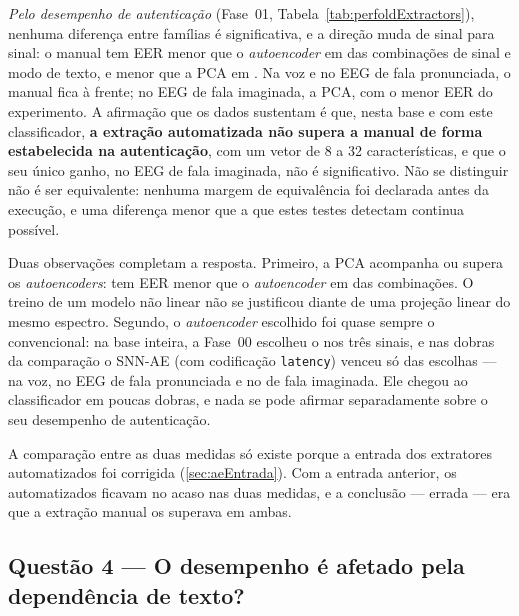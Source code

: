 	\par \emph{Pelo desempenho de autenticação} (Fase~01,
	Tabela~\ref{tab:perfoldExtractors}), nenhuma diferença entre famílias é
	significativa, e a direção muda de sinal para sinal: o manual tem \ac{EER}
	menor que o \textit{autoencoder} em  das
	 combinações de sinal e modo de texto, e menor que a
	\ac{PCA} em . Na voz e no \ac{EEG} de fala
	pronunciada, o manual fica à frente; no \ac{EEG} de fala imaginada, a
	\ac{PCA}, com o menor \ac{EER} do experimento. A afirmação que os dados
	sustentam é que, nesta base e com este classificador, \textbf{a extração
	automatizada não supera a manual de forma estabelecida na autenticação}, com
	um vetor de 8 a 32 características, e que o seu único ganho, no \ac{EEG} de
	fala imaginada, não é significativo. Não se distinguir não é ser
	equivalente: nenhuma margem de equivalência foi declarada antes da execução,
	e uma diferença menor que a que estes testes detectam continua possível.

	\par Duas observações completam a resposta. Primeiro, a \ac{PCA} acompanha
	ou supera os \textit{autoencoders}: tem \ac{EER} menor que o
	\textit{autoencoder} em  das 
	combinações. O treino de um modelo não linear não se justificou diante de
	uma projeção linear do mesmo espectro. Segundo, o \textit{autoencoder}
	escolhido foi quase sempre o convencional: na base inteira, a Fase~00
	escolheu o  nos três sinais, e nas dobras da
	comparação o \ac{SNN}-AE (com codificação \texttt{latency}) venceu só
	 das  escolhas ---
	 na voz,  no \ac{EEG}
	de fala pronunciada e  no de fala imaginada.
	Ele chegou ao classificador em poucas dobras, e nada se pode afirmar
	separadamente sobre o seu desempenho de autenticação.

	\par A comparação entre as duas medidas só existe porque a entrada dos
	extratores automatizados foi corrigida (\autoref{sec:aeEntrada}).
	Com a entrada anterior, os automatizados ficavam no acaso nas duas medidas,
	e a conclusão --- errada --- era que a extração manual os superava em
	ambas.


	\subsection*{Questão 4 --- O desempenho é afetado pela dependência de texto?}

